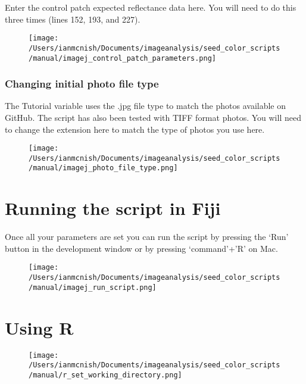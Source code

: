 \documentclass[12pt]{article}
\begin{document}
\noindent Enter the control patch expected reflectance data here. You will need to do this three times (lines 152, 193, and 227).\\

\begin{figure}[H]
	\centering
	\texttt{[image: /Users/ianmcnish/Documents/imageanalysis/seed\_color\_scripts/manual/imagej\_control\_patch\_parameters.png]}
	\label{fig:imagej_control_patch_parameters}
\end{figure}

\subsubsection{Changing initial photo file type}\label{sec:file_type}

\noindent The Tutorial variable uses the .jpg file type to match the photos available on GitHub. The script has also been tested with TIFF format photos. You will need to change the extension here to match the type of photos you use here.\\

\begin{figure}[H]
	\centering
	\texttt{[image: /Users/ianmcnish/Documents/imageanalysis/seed\_color\_scripts/manual/imagej\_photo\_file\_type.png]}
	\label{fig:imagej_photo_file_type}
\end{figure}

\section{Running the script in Fiji}\label{sec:run_imagej_script}

\noindent Once all your parameters are set you can run the script by pressing the `Run' button in the development window or by pressing `command'+'R' on Mac.\\

\begin{figure}[H]
	\centering
	\texttt{[image: /Users/ianmcnish/Documents/imageanalysis/seed\_color\_scripts/manual/imagej\_run\_script.png]}
	\label{fig:imagej_run_script}
\end{figure}

\section{Using R}\label{sec:r}

\begin{figure}[H]
	\centering
	\texttt{[image: /Users/ianmcnish/Documents/imageanalysis/seed\_color\_scripts/manual/r\_set\_working\_directory.png]}
	\label{fig:r_set_working_directory}
\end{figure}
\end{document}

